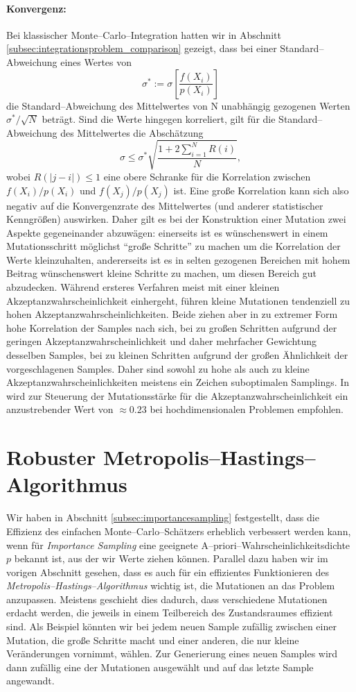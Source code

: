 	\paragraph{Konvergenz:}Bei klassischer Monte--Carlo--Integration hatten wir in Abschnitt \ref{subsec:integrationsproblem_comparison} gezeigt, dass bei einer Standard--Abweichung eines Wertes von $$\sigma^*:=\sigma\left[\frac{f(X_i)}{p(X_i)}\right]$$ die Standard--Abweichung des Mittelwertes von N unabhängig gezogenen Werten $\sigma^*/\sqrt{N}$ beträgt. Sind die Werte hingegen korreliert, gilt für die Standard--Abweichung des Mittelwertes die Abschätzung \citep[siehe][VII.\;\S3(8)]{Renyi:1964p10655}
	$$\sigma\leq \sigma^*\sqrt{\frac{1+2\sum_{i=1}^N R(i)}{N}},$$
	wobei $R(|j-i|)\leq 1$ eine obere Schranke für die Korrelation zwischen $f(X_i)/p(X_i)$ und $f(X_j)/p(X_j)$ ist.
	Eine große Korrelation kann sich also negativ auf die Konvergenzrate des Mittelwertes (und anderer statistischer Kenngrößen) auswirken. Daher gilt es bei der Konstruktion einer Mutation zwei Aspekte gegeneinander abzuwägen: einerseits ist es wünschenswert in einem Mutationsschritt möglichst ``große Schritte'' zu machen um die Korrelation der Werte kleinzuhalten, andererseits ist es in selten gezogenen Bereichen mit hohem Beitrag wünschenswert kleine Schritte zu machen, um diesen Bereich gut abzudecken. Während ersteres Verfahren meist mit einer kleinen Akzeptanzwahrscheinlichkeit einhergeht, führen kleine Mutationen tendenziell zu hohen Akzeptanzwahrscheinlichkeiten. Beide ziehen aber in zu extremer Form hohe Korrelation der Samples nach sich, bei zu großen Schritten aufgrund der geringen Akzeptanzwahrscheinlichkeit und daher mehrfacher Gewichtung desselben Samples, bei zu kleinen Schritten aufgrund der großen Ähnlichkeit der vorgeschlagenen Samples. Daher sind sowohl zu hohe als auch zu kleine Akzeptanzwahrscheinlichkeiten meistens ein Zeichen suboptimalen Samplings. In \citep{Roberts:1997p5198} wird zur Steuerung der Mutationsstärke für die Akzeptanzwahrscheinlichkeit ein anzustrebender Wert von $\approx 0.23$ bei hochdimensionalen Problemen empfohlen.

	
	
	\section{Robuster Metropolis--Hastings--Algorithmus}
	Wir haben in Abschnitt \ref{subsec:importancesampling} festgestellt, dass die Effizienz des einfachen Monte--Carlo--Schätzers erheblich verbessert werden kann, wenn für {\em Importance Sampling} eine geeignete A--priori--Wahrscheinlichkeitsdichte $p$ bekannt ist, aus der wir Werte ziehen können. Parallel dazu haben wir im vorigen Abschnitt gesehen, dass es auch für ein effizientes Funktionieren des {\em Metropolis--Hastings--Algorithmus} wichtig ist, die Mutationen an das Problem anzupassen. Meistens geschieht dies dadurch, dass verschiedene Mutationen erdacht werden, die jeweils in einem Teilbereich des Zustandsraumes effizient sind. Als Beispiel könnten wir bei jedem neuen Sample zufällig zwischen einer Mutation, die große Schritte macht und einer anderen, die nur kleine Veränderungen vornimmt, wählen. Zur Generierung eines neuen Samples wird dann zufällig eine der Mutationen ausgewählt und auf das letzte Sample angewandt.
	

